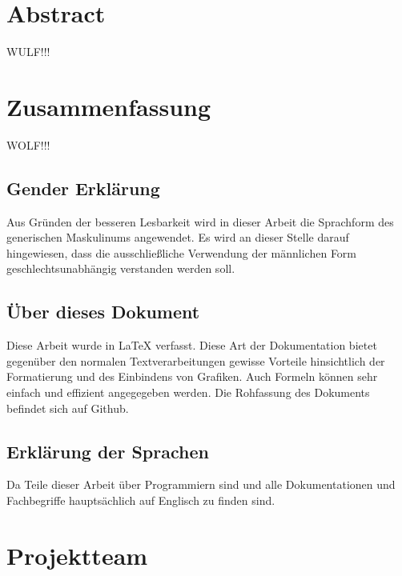 \section*{Abstract}
\label{sec:abstract}
WULF!!!

\section*{Zusammenfassung}
WOLF!!!

\clearpage

\newpage
\thispagestyle{empty}
\mbox{}

\clearpage

\subsection*{Gender Erklärung}
\label{sec:gender-erklaerung}
Aus Gründen der besseren Lesbarkeit wird in dieser Arbeit die Sprachform des generischen Maskulinums angewendet. Es wird an dieser Stelle darauf hingewiesen, dass die ausschließliche Verwendung der männlichen Form geschlechtsunabhängig verstanden werden soll.

\subsection*{Über dieses Dokument}
\label{sec:ueber-dokument}
Diese Arbeit wurde in \LaTeX{} verfasst. Diese Art der Dokumentation bietet gegenüber den normalen Textverarbeitungen gewisse Vorteile hinsichtlich der Formatierung und des Einbindens von Grafiken. Auch Formeln können sehr einfach und effizient angegegeben werden. Die Rohfassung des Dokuments befindet sich auf Github.

\subsection*{Erklärung der Sprachen}
\label{sec:sprachen-erklaerung}
Da Teile dieser Arbeit über Programmiern sind und alle Dokumentationen und Fachbegriffe hauptsächlich auf Englisch zu finden sind.

\clearpage

\newpage
\thispagestyle{empty}
\mbox{}

\clearpage

\section*{Projektteam}
\label{sec:projektteam}

